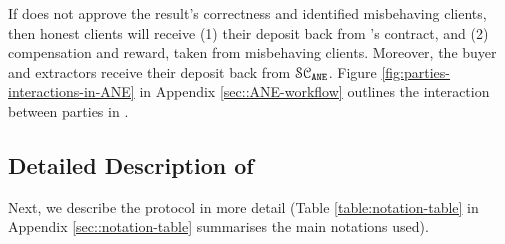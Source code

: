 If \scf does not approve the result's correctness and \aud identified misbehaving clients, then honest clients will receive (1) their deposit back from \fpsi's contract, and (2)  compensation and reward, taken from misbehaving clients. Moreover, the buyer and extractors receive their deposit back from $\mathcal{SC}_{\mathtt{ANE}}$. Figure \ref{fig:parties-interactions-in-ANE} in Appendix \ref{sec::ANE-workflow} outlines the interaction between parties in \withRew. 















 \vspace{-3.4mm}
\subsection{Detailed Description of \epsi} 
 \vspace{-1mm}

Next, we describe the protocol in more detail (Table \ref{table:notation-table} in Appendix \ref{sec::notation-table} summarises the main notations used). 



